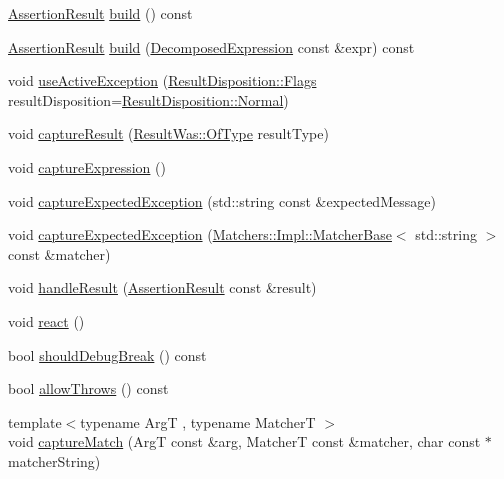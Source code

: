\begin{DoxyCompactItemize}
\item 
\hyperlink{class_catch_1_1_assertion_result}{Assertion\-Result} \hyperlink{class_catch_1_1_result_builder_a31eba48feb02817d2151e31bd8331eeb}{build} () const 
\item 
\hyperlink{class_catch_1_1_assertion_result}{Assertion\-Result} \hyperlink{class_catch_1_1_result_builder_a606377d75e78899c90f94816ae8aff61}{build} (\hyperlink{struct_catch_1_1_decomposed_expression}{Decomposed\-Expression} const \&expr) const 
\item 
void \hyperlink{class_catch_1_1_result_builder_a5bbd2f14a678f3e8d0f791ac6d233d65}{use\-Active\-Exception} (\hyperlink{struct_catch_1_1_result_disposition_a3396cad6e2259af326b3aae93e23e9d8}{Result\-Disposition\-::\-Flags} result\-Disposition=\hyperlink{struct_catch_1_1_result_disposition_a3396cad6e2259af326b3aae93e23e9d8af3bd52347ed6f8796e8ce2f77bb39ea5}{Result\-Disposition\-::\-Normal})
\item 
void \hyperlink{class_catch_1_1_result_builder_a10e467f7b7a4976e5d148b4d5066e8fd}{capture\-Result} (\hyperlink{struct_catch_1_1_result_was_a624e1ee3661fcf6094ceef1f654601ef}{Result\-Was\-::\-Of\-Type} result\-Type)
\item 
void \hyperlink{class_catch_1_1_result_builder_af2ae2343965802eeeb0abbd4ea9d2d36}{capture\-Expression} ()
\item 
void \hyperlink{class_catch_1_1_result_builder_a9ac96f6220c8dd8e4feee725c6228d77}{capture\-Expected\-Exception} (std\-::string const \&expected\-Message)
\item 
void \hyperlink{class_catch_1_1_result_builder_a2d6a194258f07f212fef098c0201038a}{capture\-Expected\-Exception} (\hyperlink{struct_catch_1_1_matchers_1_1_impl_1_1_matcher_base}{Matchers\-::\-Impl\-::\-Matcher\-Base}$<$ std\-::string $>$ const \&matcher)
\item 
void \hyperlink{class_catch_1_1_result_builder_ad8bb17e4ac590b75bf8630d8f3502f4e}{handle\-Result} (\hyperlink{class_catch_1_1_assertion_result}{Assertion\-Result} const \&result)
\item 
void \hyperlink{class_catch_1_1_result_builder_a3085cdc46533d45bed6f652a2ac295c0}{react} ()
\item 
bool \hyperlink{class_catch_1_1_result_builder_a34cdbf7ad1e5b3cb4a94047f2d14bcb2}{should\-Debug\-Break} () const 
\item 
bool \hyperlink{class_catch_1_1_result_builder_a3dbf18a3a4b00173dab052a8864e435e}{allow\-Throws} () const 
\item 
{\footnotesize template$<$typename Arg\-T , typename Matcher\-T $>$ }\\void \hyperlink{class_catch_1_1_result_builder_a27425538bec8fee7ac69403c5df6078c}{capture\-Match} (Arg\-T const \&arg, Matcher\-T const \&matcher, char const $\ast$matcher\-String)
\end{DoxyCompactItemize}


